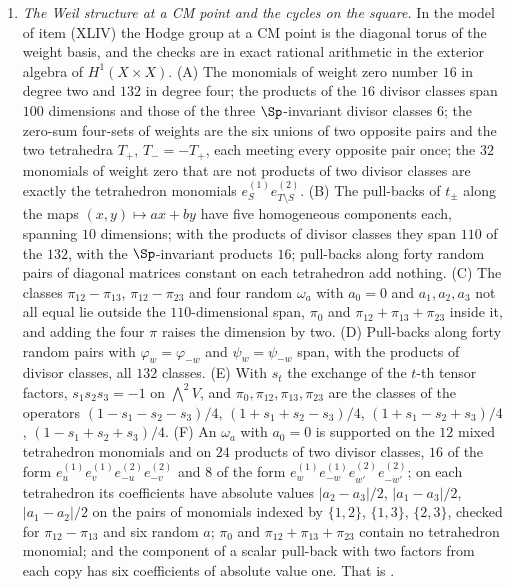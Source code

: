 \begin{enumerate}[label=\textup{(\Roman*)},leftmargin=*]
\item \emph{The Weil structure at a CM point and the cycles on the square.}
  In the model of item (XLIV) the Hodge group at a CM point is the diagonal
  torus of the weight basis, and the checks are in exact rational arithmetic
  in the exterior algebra of $H^{1}(X\times X)$. (A) The monomials of weight
  zero number $16$ in degree two and $132$ in degree four; the products of
  the $16$ divisor classes span $100$ dimensions and those of the three
  $\Sp$-invariant divisor classes $6$; the zero-sum four-sets of weights are
  the six unions of two opposite pairs and the two tetrahedra $T_{+}$,
  $T_{-}=-T_{+}$, each meeting every opposite pair once; the $32$ monomials
  of weight zero that are not products of two divisor classes are exactly the
  tetrahedron monomials $e^{(1)}_{S}e^{(2)}_{T\setminus S}$. (B) The
  pull-backs of $t_{\pm}$ along the maps $(x,y)\mapsto ax+by$ have five
  homogeneous components each, spanning $10$ dimensions; with the products
  of divisor classes they span $110$ of the $132$, with the $\Sp$-invariant
  products $16$; pull-backs along forty random pairs of diagonal matrices
  constant on each tetrahedron add nothing. (C) The classes
  $\pi_{12}-\pi_{13}$, $\pi_{12}-\pi_{23}$ and four random $\omega_{a}$
  with $a_{0}=0$ and $a_{1},a_{2},a_{3}$ not all equal lie outside the
  $110$-dimensional span, $\pi_{0}$ and $\pi_{12}+\pi_{13}+\pi_{23}$ inside
  it, and adding the four $\pi$ raises the dimension by two. (D) Pull-backs
  along forty random pairs with $\varphi_{w}=\varphi_{-w}$ and
  $\psi_{w}=\psi_{-w}$ span, with the products of divisor classes, all
  $132$ classes. (E) With $s_{t}$ the exchange of the $t$-th tensor factors,
  $s_{1}s_{2}s_{3}=-1$ on ${\textstyle\bigwedge^{2}}V$, and
  $\pi_{0},\pi_{12},\pi_{13},\pi_{23}$ are the classes of the operators
  $(1-s_{1}-s_{2}-s_{3})/4$, $(1+s_{1}+s_{2}-s_{3})/4$,
  $(1+s_{1}-s_{2}+s_{3})/4$, $(1-s_{1}+s_{2}+s_{3})/4$. (F) An $\omega_{a}$
  with $a_{0}=0$ is supported on the $12$ mixed tetrahedron monomials and on
  $24$ products of two divisor classes, $16$ of the form
  $e^{(1)}_{u}e^{(1)}_{v}e^{(2)}_{-u}e^{(2)}_{-v}$ and $8$ of the form
  $e^{(1)}_{w}e^{(1)}_{-w}e^{(2)}_{w'}e^{(2)}_{-w'}$; on each tetrahedron its
  coefficients have absolute values $|a_{2}-a_{3}|/2$, $|a_{1}-a_{3}|/2$,
  $|a_{1}-a_{2}|/2$ on the pairs of monomials indexed by $\{1,2\}$,
  $\{1,3\}$, $\{2,3\}$, checked for $\pi_{12}-\pi_{13}$ and six random
  $a$; $\pi_{0}$ and $\pi_{12}+\pi_{13}+\pi_{23}$ contain no tetrahedron
  monomial; and the component of a scalar pull-back with two factors from
  each copy has six coefficients of absolute value one. That is
  .


\end{enumerate}
